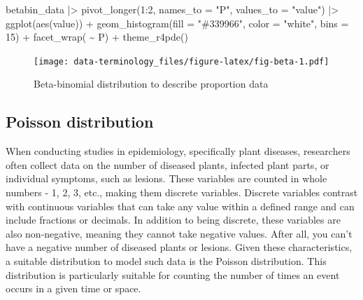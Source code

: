\documentclass[
  letterpaper,
]{book}
\newenvironment{Shaded}{\begin{snugshade}}{\end{snugshade}}
\newcommand{\AttributeTok}[1]{\textcolor[rgb]{0.40,0.45,0.13}{#1}}
\newcommand{\DecValTok}[1]{\textcolor[rgb]{0.68,0.00,0.00}{#1}}
\newcommand{\FunctionTok}[1]{\textcolor[rgb]{0.28,0.35,0.67}{#1}}
\newcommand{\NormalTok}[1]{\textcolor[rgb]{0.00,0.23,0.31}{#1}}
\newcommand{\SpecialCharTok}[1]{\textcolor[rgb]{0.37,0.37,0.37}{#1}}
\newcommand{\StringTok}[1]{\textcolor[rgb]{0.13,0.47,0.30}{#1}}
\begin{document}
\begin{Shaded}
\begin{Highlighting}[]
\NormalTok{betabin\_data }\SpecialCharTok{|\textgreater{}}
  \FunctionTok{pivot\_longer}\NormalTok{(}\DecValTok{1}\SpecialCharTok{:}\DecValTok{2}\NormalTok{, }\AttributeTok{names\_to =} \StringTok{"P"}\NormalTok{,}
               \AttributeTok{values\_to =} \StringTok{"value"}\NormalTok{) }\SpecialCharTok{|\textgreater{}}
  \FunctionTok{ggplot}\NormalTok{(}\FunctionTok{aes}\NormalTok{(value)) }\SpecialCharTok{+}
  \FunctionTok{geom\_histogram}\NormalTok{(}\AttributeTok{fill =} \StringTok{"\#339966"}\NormalTok{,}
                 \AttributeTok{color =} \StringTok{"white"}\NormalTok{,}
                 \AttributeTok{bins =} \DecValTok{15}\NormalTok{) }\SpecialCharTok{+}
  \FunctionTok{facet\_wrap}\NormalTok{( }\SpecialCharTok{\textasciitilde{}}\NormalTok{ P) }\SpecialCharTok{+}
  \FunctionTok{theme\_r4pde}\NormalTok{()}
\end{Highlighting}
\end{Shaded}

\begin{figure}

\texttt{[image: data-terminology\_files/figure-latex/fig-beta-1.pdf]} \hfill{}

\caption{\label{fig-beta}Beta-binomial distribution to describe
proportion data}

\end{figure}

\hypertarget{poisson-distribution}{%
\subsection{Poisson distribution}\label{poisson-distribution}}

When conducting studies in epidemiology, specifically plant diseases,
researchers often collect data on the number of diseased plants,
infected plant parts, or individual symptoms, such as lesions. These
variables are counted in whole numbers - 1, 2, 3, etc., making them
discrete variables. Discrete variables contrast with continuous
variables that can take any value within a defined range and can include
fractions or decimals. In addition to being discrete, these variables
are also non-negative, meaning they cannot take negative values. After
all, you can't have a negative number of diseased plants or lesions.
Given these characteristics, a suitable distribution to model such data
is the Poisson distribution. This distribution is particularly suitable
for counting the number of times an event occurs in a given time or
space.
\end{document}
